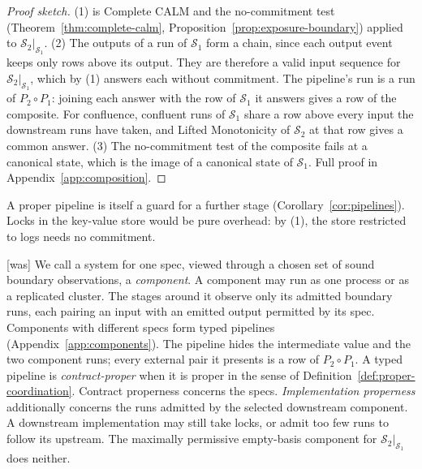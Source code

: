 \documentclass[sigconf]{cidr-2027}
\theoremstyle{remark}
\newcommand{\commitment}{commitment\xspace}
\newcommand{\Spec}{\mathcal{S}}
\begin{document}
\begin{proof}[Proof sketch]
(1) is Complete CALM and the no-\commitment test
(Theorem~\ref{thm:complete-calm}, Proposition~\ref{prop:exposure-boundary})
applied to $\Spec_2|_{\Spec_1}$.  (2) The outputs of a run of $\Spec_1$ form a
chain, since each output event keeps only rows above its output.  They are
therefore a valid input sequence for $\Spec_2|_{\Spec_1}$, which by (1) answers
each without \commitment.  The pipeline's run is a run of $P_2\circ P_1$: joining
each answer with the row of $\Spec_1$ it answers gives a row of the composite.
For confluence, confluent runs of $\Spec_1$ share a row above every input the
downstream runs have taken, and Lifted Monotonicity of $\Spec_2$ at that row
gives a common answer.  (3) The no-\commitment test
of the composite fails at a canonical state, which is the image of a canonical
state of $\Spec_1$.  Full proof in Appendix~\ref{app:composition}.
\end{proof}

A proper pipeline is itself a guard for a further stage (Corollary~\ref{cor:pipelines}).  Locks in
the key-value store would be pure overhead: by (1), the store restricted to
logs needs no \commitment.



{\footnotesize\color{black!50}\noindent\textsf{[was]} We call a system for one spec, viewed through a chosen set of sound
boundary observations, a \emph{component}.  A component may run as one
process or as a replicated cluster.  The stages around it observe only its
admitted boundary runs, each pairing an input with an emitted output
permitted by its spec.  Components with different specs
form typed pipelines (Appendix~\ref{app:components}).  The pipeline hides the
intermediate value and the two component runs; every external pair it
presents is a row of $P_2\circ P_1$.  A typed pipeline is
\emph{contract-proper} when it is proper in the sense of
Definition~\ref{def:proper-coordination}.  Contract properness concerns the
specs.  \emph{Implementation properness} additionally concerns the
runs admitted by the selected downstream component.  A downstream
implementation may still take locks, or admit too few runs to follow its
upstream.  The maximally permissive empty-basis component for
$\Spec_2|_{\Spec_1}$ does neither.\par}
\end{document}
